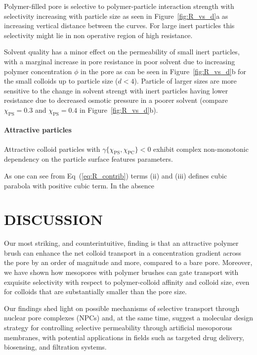 \documentclass[12pt, a4paper]{article}
\begin{document}
Polymer-filled pore is selective to polymer-particle interaction strength with selectivity increasing with particle size as seen in Figure~\ref{fig:R_vs_d}a as increasing vertical distance between the curves.
For large inert particles this selectivity might lie in non operative region of high resistance.

Solvent quality has a minor effect on the permeability of small inert particles, with a marginal increase in pore resistance in poor solvent due to increasing polymer concentration $\phi$ in the pore as can be seen in Figure~\ref{fig:R_vs_d}b for the small colloids up to particle size ($d<4$).
Particle of larger sizes are more sensitive to the change in solvent strengt with inert particles having lower resistance due to decreased osmotic pressure in a poorer solvent (compare $\chi_{\text{PS}} = 0.3$ and $\chi_{\text{PS}} = 0.4$ in Figure~\ref{fig:R_vs_d}b).




\paragraph{Attractive particles}
Attractive colloid particles with $\gamma\{\chi_{\text{PS}},\chi_{\text{PC}}\}<0$ exhibit complex non-monotonic dependency on the particle surface features parameters.

As one can see from Eq~(\ref{eq:R_contrib}) terms (ii) and (iii) defines cubic parabola with positive cubic term.
In the absence 



\section{DISCUSSION}

Our most striking, and counterintuitive, finding is that an attractive polymer brush can enhance the net colloid transport in a concentration gradient across the pore by an order of magnitude and more, compared to a bare pore.
Moreover, we have shown how mesopores with polymer brushes can gate transport with exquisite selectivity with respect to polymer-colloid affinity and colloid size, even for colloids that are substantially smaller than the pore size.

Our findings shed light on possible mechanisms of selective transport through nuclear pore complexes (NPCs) and, at the same time, suggest a molecular design strategy for controlling selective permeability through artificial mesoporous membranes, with potential applications in fields such as targeted drug delivery, biosensing, and filtration systems.
\end{document}
